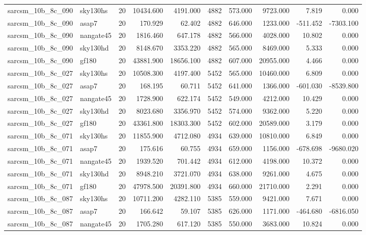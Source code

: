 \begin{longtable}{llrrrrrrrr}
sarcsm\_10b\_8c\_090 & sky130hs & 20 & 10434.600 & 4191.000 & 4882 & 573.000 & 9723.000 & 7.819 & 0.000 \\
sarcsm\_10b\_8c\_090 & asap7 & 20 & 170.929 & 62.402 & 4882 & 646.000 & 1233.000 & -511.452 & -7303.100 \\
sarcsm\_10b\_8c\_090 & nangate45 & 20 & 1816.460 & 647.178 & 4882 & 566.000 & 4028.000 & 10.802 & 0.000 \\
sarcsm\_10b\_8c\_090 & sky130hd & 20 & 8148.670 & 3353.220 & 4882 & 565.000 & 8469.000 & 5.333 & 0.000 \\
sarcsm\_10b\_8c\_090 & gf180 & 20 & 43881.900 & 18656.100 & 4882 & 607.000 & 20955.000 & 4.466 & 0.000 \\
sarcsm\_10b\_8c\_027 & sky130hs & 20 & 10508.300 & 4197.400 & 5452 & 565.000 & 10460.000 & 6.809 & 0.000 \\
sarcsm\_10b\_8c\_027 & asap7 & 20 & 168.195 & 60.711 & 5452 & 641.000 & 1366.000 & -601.030 & -8539.800 \\
sarcsm\_10b\_8c\_027 & nangate45 & 20 & 1728.900 & 622.174 & 5452 & 549.000 & 4212.000 & 10.429 & 0.000 \\
sarcsm\_10b\_8c\_027 & sky130hd & 20 & 8023.680 & 3356.970 & 5452 & 574.000 & 9362.000 & 5.220 & 0.000 \\
sarcsm\_10b\_8c\_027 & gf180 & 20 & 43361.800 & 18303.300 & 5452 & 602.000 & 20589.000 & 3.179 & 0.000 \\
sarcsm\_10b\_8c\_071 & sky130hs & 20 & 11855.900 & 4712.080 & 4934 & 639.000 & 10810.000 & 6.849 & 0.000 \\
sarcsm\_10b\_8c\_071 & asap7 & 20 & 175.616 & 60.755 & 4934 & 659.000 & 1156.000 & -678.698 & -9680.020 \\
sarcsm\_10b\_8c\_071 & nangate45 & 20 & 1939.520 & 701.442 & 4934 & 612.000 & 4198.000 & 10.372 & 0.000 \\
sarcsm\_10b\_8c\_071 & sky130hd & 20 & 8948.210 & 3721.070 & 4934 & 638.000 & 9261.000 & 4.675 & 0.000 \\
sarcsm\_10b\_8c\_071 & gf180 & 20 & 47978.500 & 20391.800 & 4934 & 660.000 & 21710.000 & 2.291 & 0.000 \\
sarcsm\_10b\_8c\_087 & sky130hs & 20 & 10711.200 & 4282.110 & 5385 & 559.000 & 9421.000 & 7.671 & 0.000 \\
sarcsm\_10b\_8c\_087 & asap7 & 20 & 166.642 & 59.107 & 5385 & 626.000 & 1171.000 & -464.680 & -6816.050 \\
sarcsm\_10b\_8c\_087 & nangate45 & 20 & 1705.280 & 617.120 & 5385 & 550.000 & 3683.000 & 10.824 & 0.000 \\

\end{longtable}
